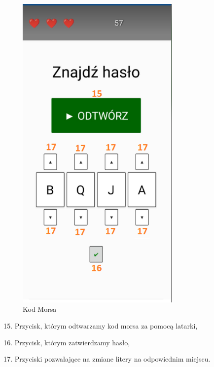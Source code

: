 	\begin{figure}[!htb]
	\begin{center}
		\includegraphics[width=8cm]{rys/opis5.png}
		\caption{Kod Morsa}
		\label{rys:rysunek001}
	\end{center}
\end{figure}

\begin{enumerate}
	\setcounter{enumi}{14}
	\item Przycisk, którym odtwarzamy kod morsa za pomocą latarki,
	\item Przycisk, którym zatwierdzamy hasło,
	\item Przyciski pozwalające na zmiane litery na odpowiednim miejscu.
	\\
	\\
	\\
	\\
	\\
	\\
\end{enumerate}

